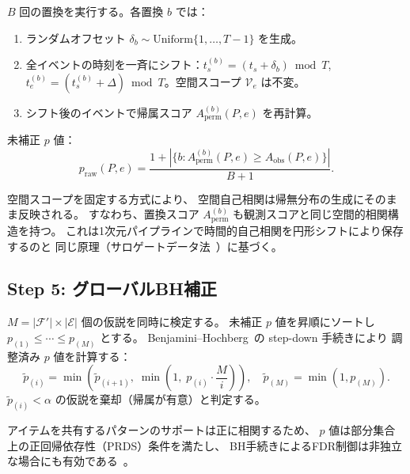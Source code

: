 $B$ 回の置換を実行する。各置換 $b$ では：
\begin{enumerate}
\item ランダムオフセット $\delta_b \sim \mathrm{Uniform}\{1, \ldots, T-1\}$ を生成。
\item 全イベントの時刻を一斉にシフト：$t_s^{(b)} = (t_s + \delta_b) \bmod T$,
$t_e^{(b)} = (t_s^{(b)} + \Delta) \bmod T$。空間スコープ $\mathcal{V}_e$ は不変。
\item シフト後のイベントで帰属スコア $A_{\mathrm{perm}}^{(b)}(P, e)$ を再計算。
\end{enumerate}

未補正 $p$ 値：
\begin{equation}\label{eq:pvalue}
p_{\mathrm{raw}}(P, e) = \frac{1 + |\{b : A_{\mathrm{perm}}^{(b)}(P, e) \geq A_{\mathrm{obs}}(P, e)\}|}{B + 1}.
\end{equation}

\begin{remark}[空間自己相関の処理]\label{rem:spatial_autocorr}
空間スコープを固定する方式により、
空間自己相関は帰無分布の生成にそのまま反映される。
すなわち、置換スコア $A_{\mathrm{perm}}^{(b)}$ も観測スコアと同じ空間的相関構造を持つ。
これは1次元パイプラインで時間的自己相関を円形シフトにより保存するのと
同じ原理（サロゲートデータ法~\cite{lancaster2018surrogate}）に基づく。
\end{remark}

\subsection{Step 5: グローバルBH補正}

$M = |\mathcal{F}'| \times |\mathcal{E}|$ 個の仮説を同時に検定する。
未補正 $p$ 値を昇順にソートし $p_{(1)} \leq \cdots \leq p_{(M)}$ とする。
Benjamini--Hochberg~\cite{benjamini1995controlling}の step-down 手続きにより
調整済み $p$ 値を計算する：
\begin{equation}\label{eq:bh}
\tilde{p}_{(i)} = \min\!\left(\tilde{p}_{(i+1)},\; \min\!\left(1,\; p_{(i)} \cdot \frac{M}{i}\right)\right),
\quad \tilde{p}_{(M)} = \min(1, p_{(M)}).
\end{equation}
$\tilde{p}_{(i)} < \alpha$ の仮説を棄却（帰属が有意）と判定する。

\begin{remark}[PRDS条件]
アイテムを共有するパターンのサポートは正に相関するため、
$p$ 値は部分集合上の正回帰依存性（PRDS）条件を満たし、
BH手続きによるFDR制御は非独立な場合にも有効である~\cite{benjamini2001control}。
\end{remark}

